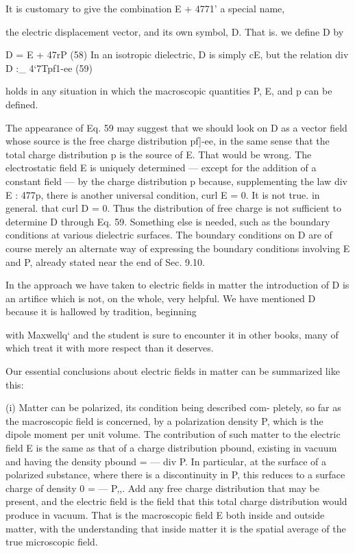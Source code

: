 {{{It is customary to give the combination E + 4771' a special name,

the electric displacement vector, and its own symbol, D. That is. we
define D by

\begin{equation}
\end{equation}
D = E + 47rP (58)
In an isotropic dielectric, D is simply cE, but the relation
div D :_ 4‘7Tpf1-ee (59)

holds in any situation in which the macroscopic quantities P, E, and
p can be defined.

The appearance of Eq. 59 may suggest that we should look on D
as a vector field whose source is the free charge distribution pf]-ee, in
the same sense that the total charge distribution p is the source of E.
That would be wrong. The electrostatic field E is uniquely determined
--- except for the addition of a constant field --- by the charge
distribution p because, supplementing the law div E : 477p, there
is another universal condition, curl E = 0. It is not true. in general.
that curl D = 0. Thus the distribution of free charge is not sufficient
to determine D through Eq. 59. Something else is needed, such as
the boundary conditions at various dielectric surfaces. The boundary
conditions on D are of course merely an alternate way of expressing
the boundary conditions involving E and P, already stated near
the end of Sec. 9.10.

In the approach we have taken to electric fields in matter the introduction
of D is an artifice which is not, on the whole, very helpful.
We have mentioned D because it is hallowed by tradition, beginning

with Maxwellq‘ and the student is sure to encounter it in other books,
many of which treat it with more respect than it deserves.

Our essential conclusions about electric fields in matter can be
summarized like this:

(i) Matter can be polarized, its condition being described com-
pletely, so far as the macroscopic field is concerned, by a
polarization density P, which is the dipole moment per unit
volume. The contribution of such matter to the electric
field E is the same as that of a charge distribution pbound,
existing in vacuum and having the density pbound =  --- div P.
In particular, at the surface of a polarized substance, where
there is a discontinuity in P, this reduces to a surface charge
of density 0 =  --- P,,. Add any free charge distribution that
may be present, and the electric field is the field that this
total charge distribution would produce in vacuum. That
is the macroscopic field E both inside and outside matter,
with the understanding that inside matter it is the spatial
average of the true microscopic field.

}}}
